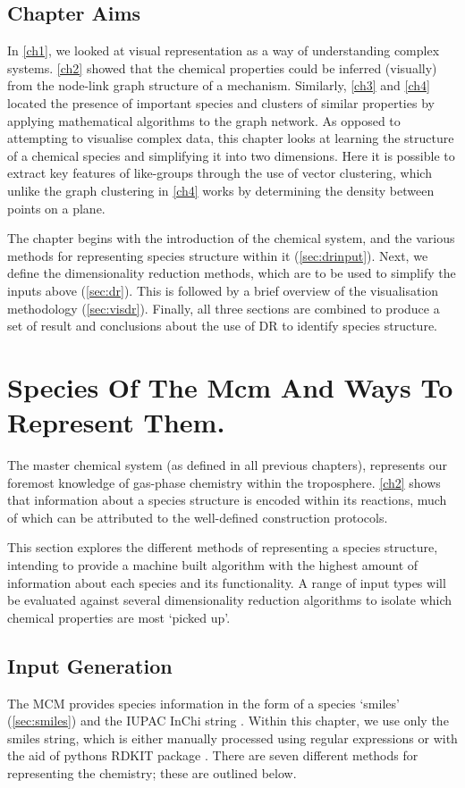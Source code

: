 \subsection*{Chapter Aims}
In \autoref{ch1}, we looked at visual representation as a way of understanding complex systems. \autoref{ch2} showed that the chemical properties could be inferred (visually) from the node-link graph structure of a mechanism. Similarly, \autoref{ch3} and \autoref{ch4} located the presence of important species and clusters of similar properties by applying mathematical algorithms to the graph network. As opposed to attempting to visualise complex data, this chapter looks at learning the structure of a chemical species and simplifying it into two dimensions. Here it is possible to extract key features of like-groups through the use of vector clustering, which unlike the graph clustering in \autoref{ch4} works by determining the density between points on a plane.

The chapter begins with the introduction of the chemical system, and the various methods for representing species structure within it (\autoref{sec:drinput}). Next, we define the dimensionality reduction methods, which are to be used to simplify the inputs above (\autoref{sec:dr}). This is followed by a brief overview of the visualisation methodology (\autoref{sec:visdr}). Finally, all three sections are combined to produce a set of result and conclusions about the use of DR to identify species structure.



\section{Species Of The Mcm And Ways To Represent Them.}\label{sec:drinput}
The master chemical system (as defined in all previous chapters), represents our foremost knowledge of gas-phase chemistry within the troposphere.  \autoref{ch2} shows that information about a species structure is encoded within its reactions, much of which can be attributed to the well-defined construction protocols.

This section explores the different methods of representing a species structure, intending to provide a machine built algorithm with the highest amount of information about each species and its functionality. A range of input types will be evaluated against several dimensionality reduction algorithms to isolate which chemical properties are most `picked up'.

\subsection{Input Generation}
The MCM provides species information in the form of a species `smiles' (\autoref{sec:smiles}) and the IUPAC InChi string \citep{inchi}. Within this chapter, we use only the smiles string, which is either manually processed using regular expressions or with the aid of pythons RDKIT package \citep{rdkit}. There are seven different methods for representing the chemistry; these are outlined below.



